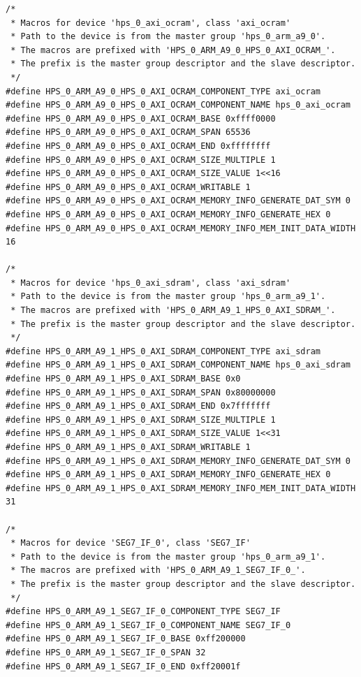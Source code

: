 \documentclass[conference]{IEEEtran}
\begin{document}
\begin{lstlisting}
/*
 * Macros for device 'hps_0_axi_ocram', class 'axi_ocram'
 * Path to the device is from the master group 'hps_0_arm_a9_0'.
 * The macros are prefixed with 'HPS_0_ARM_A9_0_HPS_0_AXI_OCRAM_'.
 * The prefix is the master group descriptor and the slave descriptor.
 */
#define HPS_0_ARM_A9_0_HPS_0_AXI_OCRAM_COMPONENT_TYPE axi_ocram
#define HPS_0_ARM_A9_0_HPS_0_AXI_OCRAM_COMPONENT_NAME hps_0_axi_ocram
#define HPS_0_ARM_A9_0_HPS_0_AXI_OCRAM_BASE 0xffff0000
#define HPS_0_ARM_A9_0_HPS_0_AXI_OCRAM_SPAN 65536
#define HPS_0_ARM_A9_0_HPS_0_AXI_OCRAM_END 0xffffffff
#define HPS_0_ARM_A9_0_HPS_0_AXI_OCRAM_SIZE_MULTIPLE 1
#define HPS_0_ARM_A9_0_HPS_0_AXI_OCRAM_SIZE_VALUE 1<<16
#define HPS_0_ARM_A9_0_HPS_0_AXI_OCRAM_WRITABLE 1
#define HPS_0_ARM_A9_0_HPS_0_AXI_OCRAM_MEMORY_INFO_GENERATE_DAT_SYM 0
#define HPS_0_ARM_A9_0_HPS_0_AXI_OCRAM_MEMORY_INFO_GENERATE_HEX 0
#define HPS_0_ARM_A9_0_HPS_0_AXI_OCRAM_MEMORY_INFO_MEM_INIT_DATA_WIDTH 16

/*
 * Macros for device 'hps_0_axi_sdram', class 'axi_sdram'
 * Path to the device is from the master group 'hps_0_arm_a9_1'.
 * The macros are prefixed with 'HPS_0_ARM_A9_1_HPS_0_AXI_SDRAM_'.
 * The prefix is the master group descriptor and the slave descriptor.
 */
#define HPS_0_ARM_A9_1_HPS_0_AXI_SDRAM_COMPONENT_TYPE axi_sdram
#define HPS_0_ARM_A9_1_HPS_0_AXI_SDRAM_COMPONENT_NAME hps_0_axi_sdram
#define HPS_0_ARM_A9_1_HPS_0_AXI_SDRAM_BASE 0x0
#define HPS_0_ARM_A9_1_HPS_0_AXI_SDRAM_SPAN 0x80000000
#define HPS_0_ARM_A9_1_HPS_0_AXI_SDRAM_END 0x7fffffff
#define HPS_0_ARM_A9_1_HPS_0_AXI_SDRAM_SIZE_MULTIPLE 1
#define HPS_0_ARM_A9_1_HPS_0_AXI_SDRAM_SIZE_VALUE 1<<31
#define HPS_0_ARM_A9_1_HPS_0_AXI_SDRAM_WRITABLE 1
#define HPS_0_ARM_A9_1_HPS_0_AXI_SDRAM_MEMORY_INFO_GENERATE_DAT_SYM 0
#define HPS_0_ARM_A9_1_HPS_0_AXI_SDRAM_MEMORY_INFO_GENERATE_HEX 0
#define HPS_0_ARM_A9_1_HPS_0_AXI_SDRAM_MEMORY_INFO_MEM_INIT_DATA_WIDTH 31

/*
 * Macros for device 'SEG7_IF_0', class 'SEG7_IF'
 * Path to the device is from the master group 'hps_0_arm_a9_1'.
 * The macros are prefixed with 'HPS_0_ARM_A9_1_SEG7_IF_0_'.
 * The prefix is the master group descriptor and the slave descriptor.
 */
#define HPS_0_ARM_A9_1_SEG7_IF_0_COMPONENT_TYPE SEG7_IF
#define HPS_0_ARM_A9_1_SEG7_IF_0_COMPONENT_NAME SEG7_IF_0
#define HPS_0_ARM_A9_1_SEG7_IF_0_BASE 0xff200000
#define HPS_0_ARM_A9_1_SEG7_IF_0_SPAN 32
#define HPS_0_ARM_A9_1_SEG7_IF_0_END 0xff20001f


\end{lstlisting}
\end{document}
